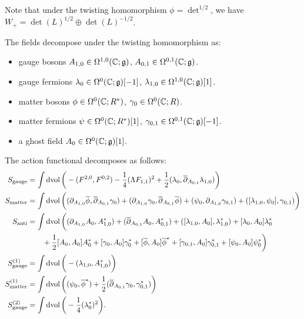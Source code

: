 \documentclass[10pt, oneside]{article}
\begin{document}
Note that under the twisting homomorphism $\phi = \det^{1/2}$, we have $W_+ = \det(L)^{1/2} \oplus \det(L)^{-1/2}$.

The fields decompose under the twisting homomorphism as:
\begin{itemize}
\item gauge bosons $A_{1,0} \in \Omega^{1,0}(\mathbb C ; \mathfrak g)$, $A_{0,1} \in \Omega^{0,1}(\mathbb C ; \mathfrak g)$.
\item gauge fermions $\lambda_0 \in \Omega^0(\mathbb C ; \mathfrak g)[-1]$, $\lambda_{1,0} \in \Omega^{1,0}(\mathbb C ; \mathfrak g) [1]$.
\item matter bosons $\phi \in \Omega^0(\mathbb C ; R^*)$, $\gamma_0 \in \Omega^0(\mathbb C ; R)$.
\item matter fermions $\psi \in \Omega^{0}(\mathbb C ; R^*)[1]$, $\gamma_{0,1} \in \Omega^{0,1}(\mathbb C ; \mathfrak g)[-1]$.
\item a ghost field $A_0 \in \Omega^0(\mathbb C ; \mathfrak g)[1]$.
\end{itemize}

The action functional decomposes as follows:
\begin{align*}
S_{\mathrm{gauge}} &= \int \operatorname{dvol} \bigg(-(F^{2, 0}, F^{0, 2}) - \frac{1}{4}(\Lambda F_{1, 1})^2 + \frac 12 (\lambda_0 , \overline{\partial}_{A_{0,1}} \lambda_{1,0})  \bigg)    \\
S_{\mathrm{matter}} &= \int \operatorname{dvol} \bigg( (\partial_{A_{1,0}}\overline{\phi} , \overline{\partial}_{A_{0,1}} \gamma_0) + (\partial_{A_{1,0}}\gamma_0, \overline{\partial}_{A_{0,1}} \overline{\phi}) + (\psi_0 , \partial_{A_{1,0}} \gamma_{0,1}) + ([\lambda_{1,0}, \psi_0], \gamma_{0,1})   \bigg) \\
S_{\mathrm{anti}} &= \int \operatorname{dvol} \bigg( (\partial_{A_{1, 0}} A_0 , A_{1,0}^*) + (\overline{\partial}_{A_{0, 1}} A_0, A_{0,1}^*) + ([\lambda_{1,0}, A_0], \lambda_{1,0}^*) +  [\lambda_{0}, A_0] \lambda_{0}^*\\
&\qquad + \frac{1}{2}[A_0, A_0]A_0^* + [\gamma_0, A_0] \gamma_0^* + [\overline{\phi}, A_0] \overline{\phi}^* + [\gamma_{0,1}, A_0] \gamma_{0,1}^* + [\psi_0, A_0] \psi_{0}^*\bigg) \\
S^{(1)}_{\mathrm{gauge}} &=  \int \operatorname{dvol} \bigg( - (\lambda_{1,0}, A_{1,0}^*) \bigg) \\
S^{(1)}_{\mathrm{matter}} &=  \int \operatorname{dvol} \bigg( (\psi_{0}, \overline{\phi}^*) + \frac 12(\overline{\partial}_{A_{0,1}} \gamma_0, \gamma_{0,1}^*) \bigg)\\
S^{(2)}_{\mathrm{gauge}} &= \int \operatorname{dvol} \bigg( -\frac{1}{4} (\lambda_0^*)^2 \bigg) .
\end{align*}
\end{document}
